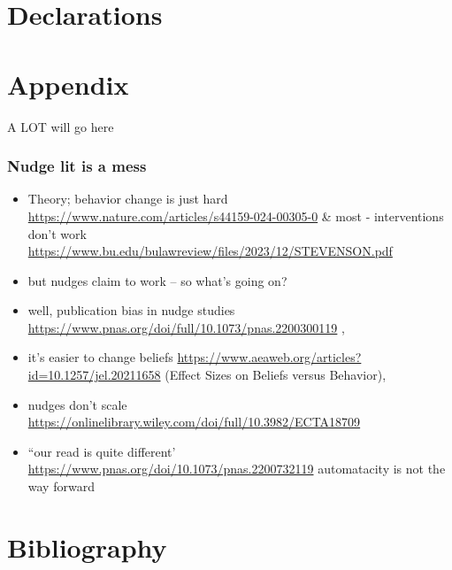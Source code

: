 \documentclass[sn-nature,pdflatex]{sn-jnl}
\begin{document}

\section*{Declarations}\label{declarations}

\section{Appendix}\label{secA1}

A LOT will go here

\subsubsection{Nudge lit is a mess}\label{nudge-lit-is-a-mess}

\begin{itemize}
\item
  Theory; behavior change is just hard
  \url{https://www.nature.com/articles/s44159-024-00305-0} \& most -
  interventions don't work
  \url{https://www.bu.edu/bulawreview/files/2023/12/STEVENSON.pdf}
\item
  but nudges claim to work -- so what's going on?
\item
  well, publication bias in nudge studies
  \url{https://www.pnas.org/doi/full/10.1073/pnas.2200300119} ,
\item
  it's easier to change beliefs
  \url{https://www.aeaweb.org/articles?id=10.1257/jel.20211658} (Effect
  Sizes on Beliefs versus Behavior),
\item
  nudges don't scale
  \url{https://onlinelibrary.wiley.com/doi/full/10.3982/ECTA18709}
\item
  ``our read is quite different'
  \url{https://www.pnas.org/doi/10.1073/pnas.2200732119} automatacity is
  not the way forward
\end{itemize}

\section{Bibliography}\label{bibliography}

\renewcommand\refname{References}

\end{document}
